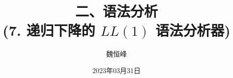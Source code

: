 \documentclass[]{beamer}
\title[语法分析]{二、语法分析 \\ (7. 递归下降的 $LL(1)$ 语法分析器)}
\author[魏恒峰]{\large 魏恒峰}
\institute{hfwei@nju.edu.cn}
\date{2023年03月31日}
\begin{document}
\maketitle




\thankyou{}

\end{document}
